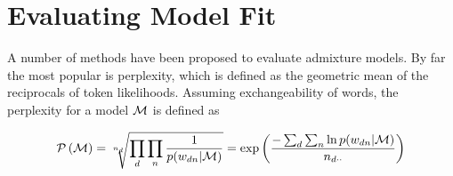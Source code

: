 %
%


\section{Evaluating Model Fit}
\label{sec:chap1:eval}

A number of methods have been proposed to evaluate admixture models. By far the most popular is perplexity, which is defined as the geometric mean of the reciprocals of token likelihoods. Assuming exchangeability of words, the perplexity for a model $\mathcal{M}$ is defined as

\begin{align}
\mathcal{P} \left( { \mathcal{M} } \right) = \sqrt[n_{d}]{\prod_d \prod_n \frac{1}{p(w_{dn}|\mathcal{M})}} = \exp \left( \frac{-\sum_d \sum_n \ln p(w_{dn}|\mathcal{M})}{n_{d\cdot\cdot}} \right) \label{eqn:perp_def}
\end{align}

